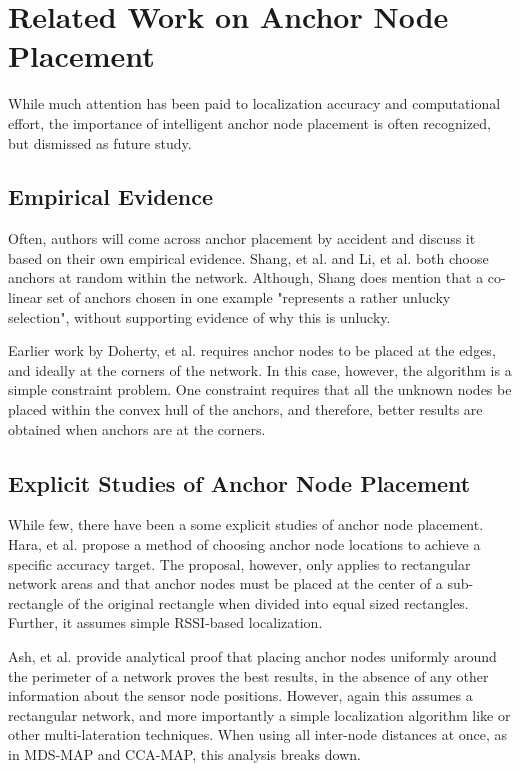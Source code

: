\chapter{Related Work on Anchor Node Placement}
\label{chap:RelatedWork}
While much attention has been paid to localization accuracy and computational effort, the importance of intelligent anchor node placement is often recognized, but dismissed as future study.

\section{Empirical Evidence}

Often, authors will come across anchor placement by accident and discuss it based on their own empirical evidence.  Shang, et al.\cite[p. 964]{MDS-MAP} and Li, et al.\cite[p. 11]{CCA-MAP07} both choose anchors at random within the network.  Although, Shang does mention that a co-linear set of anchors chosen in one example "represents a rather unlucky selection", without supporting evidence of why this is unlucky.

Earlier work by Doherty, et al.\cite{Doherty} requires anchor nodes to be placed at the edges, and ideally at the corners of the network.  In this case, however, the algorithm is a simple constraint problem.  One constraint requires that all the unknown nodes be placed within the convex hull of the anchors, and therefore, better results are obtained when anchors are at the corners.

\section{Explicit Studies of Anchor Node Placement}
While few, there have been a some explicit studies of anchor node placement.  Hara, et al.\cite{Hara} propose a method of choosing anchor node locations to achieve a specific accuracy target.  The proposal, however, only applies to rectangular network areas and that anchor nodes must be placed at the center of a sub-rectangle of the original rectangle when divided into equal sized rectangles.  Further, it assumes simple RSSI-based localization.  

Ash, et al.\cite{Ash} provide analytical proof that placing anchor nodes uniformly around the perimeter of a network proves the best results, in the absence of any other information about the sensor node positions. However, again this assumes a rectangular network, and more importantly a simple localization algorithm like \cite{Doherty} or other multi-lateration techniques.  When using all inter-node distances at once, as in MDS-MAP and CCA-MAP, this analysis breaks down.

